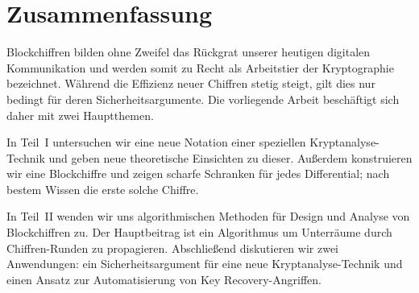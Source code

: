 \chapter*{Zusammenfassung}

Blockchiffren bilden ohne Zweifel das Rückgrat unserer heutigen digitalen Kommunikation und werden somit zu Recht als Arbeitstier der Kryptographie bezeichnet.
Während die Effizienz neuer Chiffren stetig steigt, gilt dies nur bedingt für deren Sicherheitsargumente.
Die vorliegende Arbeit beschäftigt sich daher mit zwei Hauptthemen.

In Teil~I untersuchen wir eine neue Notation einer speziellen Kryptanalyse-Technik und geben neue theoretische Einsichten zu dieser.
Außerdem konstruieren wir eine Blockchiffre und zeigen scharfe Schranken für jedes Differential; nach bestem Wissen die erste solche Chiffre.

In Teil~II wenden wir uns algorithmischen Methoden für Design und Analyse von Blockchiffren zu.
Der Hauptbeitrag ist ein Algorithmus um Unterräume durch Chiffren-Runden zu propagieren.
Abschließend diskutieren wir zwei Anwendungen: ein Sicherheitsargument für eine neue Kryptanalyse-Technik und einen Ansatz zur Automatisierung von Key Re\-cov\-ery-Angriffen.
